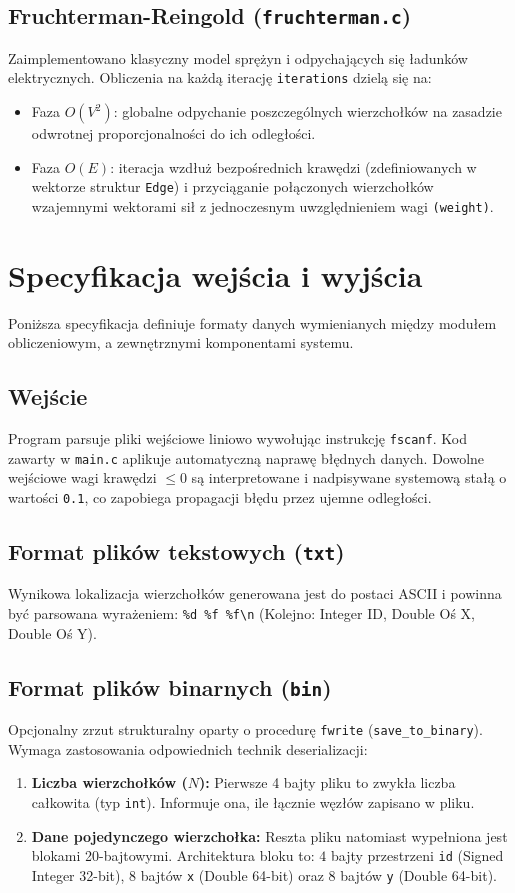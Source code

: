 \documentclass[12pt,a4paper]{article}
\begin{document}
\subsection{Fruchterman-Reingold (\texttt{fruchterman.c})}
Zaimplementowano klasyczny model sprężyn i odpychających się ładunków elektrycznych. Obliczenia na każdą iterację \texttt{iterations} dzielą się na:
\begin{itemize}
    \item Faza $O(V^2)$: globalne odpychanie poszczególnych wierzchołków na zasadzie odwrotnej proporcjonalności do ich odległości.
    \item Faza $O(E)$: iteracja wzdłuż bezpośrednich krawędzi (zdefiniowanych w wektorze struktur \texttt{Edge}) i przyciąganie połączonych wierzchołków wzajemnymi wektorami sił z jednoczesnym uwzględnieniem wagi \texttt{(weight)}.
\end{itemize}

\section{Specyfikacja wejścia i wyjścia}
Poniższa specyfikacja definiuje formaty danych wymienianych między modułem obliczeniowym, a zewnętrznymi komponentami systemu.

\subsection{Wejście}
Program parsuje pliki wejściowe liniowo wywołując instrukcję \texttt{fscanf}. Kod zawarty w \texttt{main.c} aplikuje automatyczną naprawę błędnych danych. Dowolne wejściowe wagi krawędzi $\le 0$ są interpretowane i nadpisywane systemową stałą o wartości \texttt{0.1}, co zapobiega propagacji błędu przez ujemne odległości.

\subsection{Format plików tekstowych (\texttt{txt})}
Wynikowa lokalizacja wierzchołków generowana jest do postaci ASCII i powinna być parsowana wyrażeniem: \verb|%d %f %f\n| (Kolejno: Integer ID, Double Oś X, Double Oś Y).

\subsection{Format plików binarnych (\texttt{bin})}
Opcjonalny zrzut strukturalny oparty o procedurę \texttt{fwrite} (\texttt{save\_to\_binary}). Wymaga zastosowania odpowiednich technik deserializacji:
\begin{enumerate}
    \item \textbf{Liczba wierzchołków ($N$):} Pierwsze 4 bajty pliku to zwykła liczba całkowita (typ \texttt{int}). Informuje ona, ile łącznie węzłów zapisano w pliku.
    \item \textbf{Dane pojedynczego wierzchołka:} Reszta pliku natomiast wypełniona jest blokami 20-bajtowymi. Architektura bloku to: $4$ bajty przestrzeni \texttt{id} (Signed Integer 32-bit), $8$ bajtów \texttt{x} (Double 64-bit) oraz $8$ bajtów \texttt{y} (Double 64-bit).
\end{enumerate}
\end{document}
